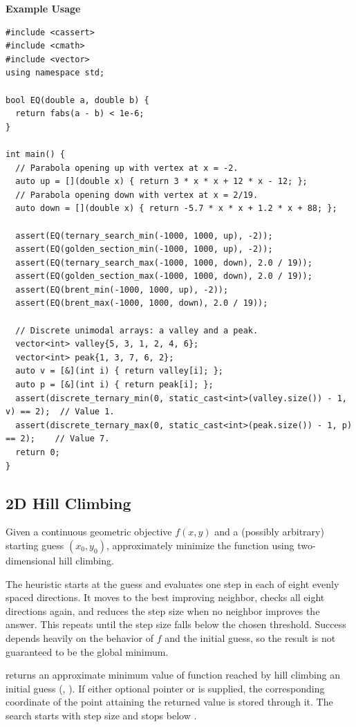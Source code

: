 \textbf{Example Usage}\par
\begin{lstlisting}[style=cpp]
#include <cassert>
#include <cmath>
#include <vector>
using namespace std;

bool EQ(double a, double b) {
  return fabs(a - b) < 1e-6;
}

int main() {
  // Parabola opening up with vertex at x = -2.
  auto up = [](double x) { return 3 * x * x + 12 * x - 12; };
  // Parabola opening down with vertex at x = 2/19.
  auto down = [](double x) { return -5.7 * x * x + 1.2 * x + 88; };

  assert(EQ(ternary_search_min(-1000, 1000, up), -2));
  assert(EQ(golden_section_min(-1000, 1000, up), -2));
  assert(EQ(ternary_search_max(-1000, 1000, down), 2.0 / 19));
  assert(EQ(golden_section_max(-1000, 1000, down), 2.0 / 19));
  assert(EQ(brent_min(-1000, 1000, up), -2));
  assert(EQ(brent_max(-1000, 1000, down), 2.0 / 19));

  // Discrete unimodal arrays: a valley and a peak.
  vector<int> valley{5, 3, 1, 2, 4, 6};
  vector<int> peak{1, 3, 7, 6, 2};
  auto v = [&](int i) { return valley[i]; };
  auto p = [&](int i) { return peak[i]; };
  assert(discrete_ternary_min(0, static_cast<int>(valley.size()) - 1, v) == 2);  // Value 1.
  assert(discrete_ternary_max(0, static_cast<int>(peak.size()) - 1, p) == 2);    // Value 7.
  return 0;
}
\end{lstlisting}
\subsection{2D Hill Climbing}
\label{sec:5.2.2}
Given a continuous geometric objective $f(x, y)$ and a (possibly arbitrary) starting guess $(x_0, y_0)$, approximately minimize the function using two-dimensional hill climbing.

The heuristic starts at the guess and evaluates one step in each of eight evenly spaced directions. It moves to the best improving neighbor, checks all eight directions again, and reduces the step size when no neighbor improves the answer. This repeats until the step size falls below the chosen threshold. Success depends heavily on the behavior of $f$ and the initial guess, so the result is not guaranteed to be the global minimum.

\begin{compactitem}
  \item {} returns an approximate minimum value of function  reached by hill climbing an initial guess (, ). If either optional pointer  or  is supplied, the corresponding coordinate of the point attaining the returned value is stored through it. The search starts with step size  and stops below .
\end{compactitem}

